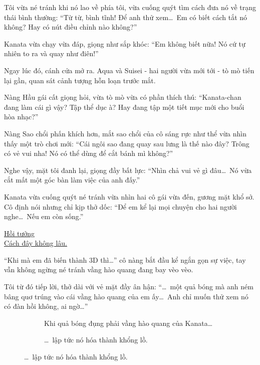 \documentclass[../main.tex]{subfiles}
\begin{document}
Tôi vừa né tránh khi nó lao về phía tôi, vừa cuống quýt tìm cách đưa nó về trạng thái bình thường: ``Từ từ, bình tĩnh! Để anh thử xem\dots\ Em có biết cách tắt nó không? Hay có nút điều chỉnh nào không?''

Kanata vừa chạy vừa đáp, giọng như sắp khóc: ``Em không biết nữa! Nó cứ tự nhiên to ra và quay như điên!''

Ngay lúc đó, cánh cửa mở ra. Aqua và Suisei - hai người vừa mới tới - tò mò tiến lại gần, quan sát cảnh tượng hỗn loạn trước mắt.


Nàng Hầu gái cất giọng hỏi, vừa tò mò vừa có phần thích thú: ``Kanata-chan đang làm cái gì vậy? Tập thể dục à? Hay đang tập một tiết mục mới cho buổi hòa nhạc?''

Nàng Sao chổi phấn khích hơn, mắt sao chổi của cô sáng rực như thể vừa nhìn thấy một trò chơi mới: ``Cái ngôi sao đang quay sau lưng là thế nào đây? Trông có vẻ vui nha! Nó có thể dùng để cắt bánh mì không?''

Nghe vậy, mặt tôi đanh lại, giọng đầy bất lực: ``Nhìn chả vui vẻ gì đâu\dots\ Nó vừa cắt mất một góc bàn làm việc của anh đấy.''

Kanata vừa cuống quýt né tránh vừa nhìn hai cô gái vừa đến, gương mặt khổ sở. Cô định nói nhưng chỉ kịp thở dốc: ``Để em kể lại mọi chuyện cho hai người nghe\dots\ Nếu em còn sống.''

\begin{center}
  \uline{Hồi tưởng\\Cách đây không lâu.}
\end{center}

``Khi mà em đã biến thành 3D thì\dots''  cô nàng bắt đầu kể ngắn gọn sự việc, tay vẫn không ngừng né tránh vầng hào quang đang bay vèo vèo.

Tôi từ đó tiếp lời, thở dài với vẻ mặt đầy ân hận: ``\dots\ một quả bóng mà anh ném bâng quơ trúng vào cái vầng hào quang của em ấy\dots\ Anh chỉ muốn thử xem nó có đàn hồi không, ai ngờ\dots''

\begin{figure}[H]
  \centering
  \begin{subfigure}[t]{0.45\textwidth}
    \centering
    \caption{Khi quả bóng đụng phải vầng hào quang của Kanata…}
  \end{subfigure}
  \quad
  \begin{subfigure}[t]{0.45\textwidth}
    \centering
    \caption{\dots\ lập tức nó hóa thành khổng lồ.}
  \end{subfigure}
\end{figure}
\end{document}
